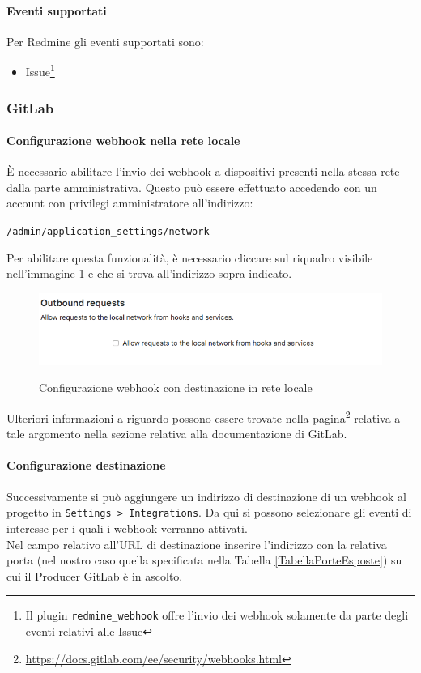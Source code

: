 	\paragraph{Eventi supportati}
	Per Redmine gli eventi supportati sono:
	\begin{itemize}
		\item Issue\footnote{Il plugin \texttt{redmine\_webhook} offre l'invio dei webhook solamente da parte degli eventi relativi alle Issue}
	\end{itemize}

	\subsubsection{GitLab}
	\paragraph{Configurazione webhook nella rete locale}
	È necessario abilitare l'invio dei webhook a dispositivi presenti nella stessa rete dalla parte amministrativa.
	Questo può essere effettuato accedendo con un account con privilegi amministratore all'indirizzo:
	\begin{center}
		\texttt{\url{/admin/application_settings/network}}
	\end{center}
	Per abilitare questa funzionalità, è necessario cliccare sul riquadro visibile nell'immagine \ref{ConfigWebGit} e che si trova all'indirizzo sopra indicato.
	\begin{figure}[H]
		\centering
		\includegraphics[width=13cm]{img/webhook_gitlab_setup.png}\\
		\caption{Configurazione webhook con destinazione in rete locale}
		\label{ConfigWebGit}
	\end{figure}
	Ulteriori informazioni a riguardo possono essere trovate nella pagina\footnote{\url{https://docs.gitlab.com/ee/security/webhooks.html}} relativa a tale argomento nella sezione relativa alla documentazione di GitLab.

	\paragraph{Configurazione destinazione}
	Successivamente si può aggiungere un indirizzo di destinazione di un webhook al progetto in \texttt{Settings > Integrations}.
	Da qui si possono selezionare gli eventi di interesse per i quali i webhook verranno attivati.\\
	Nel campo relativo all'URL di destinazione inserire l'indirizzo con la relativa porta (nel nostro caso quella specificata nella Tabella \ref{TabellaPorteEsposte}) su cui il Producer GitLab è in ascolto.
